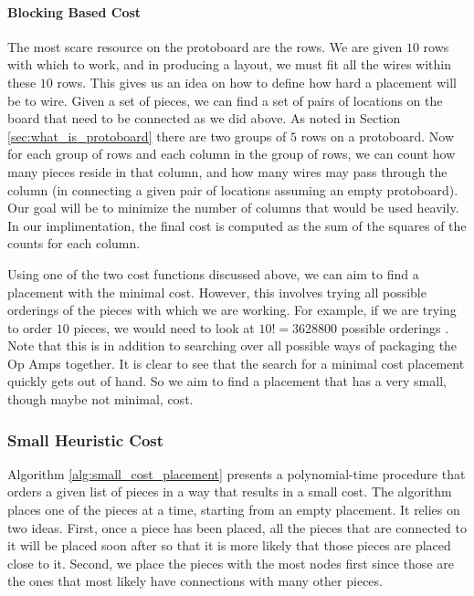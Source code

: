 \paragraph{Blocking Based Cost}
The most scare resource on the protoboard are the rows. We are given $10$ rows
with which to work, and in producing a layout, we must fit all the wires within
these $10$ rows. This gives us an idea on how to define how hard a placement
will be to wire. Given a set of pieces, we can find a set of pairs of locations
on the board that need to be connected as we did above.
As noted in Section \ref{sec:what_is_protoboard} there are two groups of $5$
rows on a protoboard. Now for each group of rows and each column in the group of
rows, we can count how many pieces reside in that column, and how many wires may
pass through the column (in connecting a given pair of locations assuming an
empty protoboard). Our goal will be to minimize the number of columns that
would be used heavily. In our implimentation, the final cost is computed as
the sum of the squares of the counts for each column.

Using one of the two cost functions discussed above, we can aim to find a
placement with the minimal cost. However, this involves trying all possible
orderings of the pieces with which we are working. For example, if we are trying
to order $10$ pieces, we would need to look at $10! = 3628800$ possible
orderings \q. Note that this is in addition to
searching over all possible ways
of packaging the Op Amps together. It is clear to see that the search for a
minimal cost placement quickly gets out of hand. So we aim to find a placement
that has a very small, though maybe not minimal, cost.

\subsubsection{Small Heuristic Cost}

Algorithm \ref{alg:small_cost_placement} presents a polynomial-time procedure
that orders a
given list of pieces in a way that results in a small cost. The algorithm places
one of the pieces at a time, starting from an empty placement. It relies
on two ideas. First, once a piece has been placed, all the pieces that are
connected to it will be placed soon after so that it is more likely that those
pieces are placed close to it. Second, we place the pieces with the most nodes
first since those are the ones that most likely have connections with many other
pieces.


